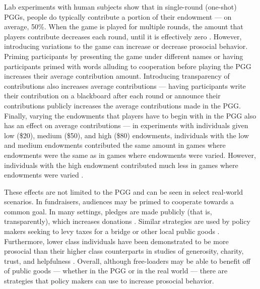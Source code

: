 Lab experiments with human subjects show that in single-round (one-shot) PGGs, people do typically contribute a portion of their endowment — on average, 50\%. When the game is played for multiple rounds, the amount that players contribute decreases each round, until it is effectively zero \cite{labexperiments}. However, introducing variations to the game can increase or decrease prosocial behavior. Priming participants by presenting the game under different names \cite{Eriksson_Strimling_2014} or having participants primed with words alluding to cooperation before playing the PGG \cite{drouvelis2015priming} increases their average contribution amount. Introducing transparency of contributions also increases average contributions — having participants write their contribution on a blackboard after each round \cite{rege2004impact} or announce their contributions publicly \cite{transparencytwo} increases the average contributions made in the PGG. Finally, varying the endowments that players have to begin with in the PGG also has an effect on average contributions — in experiments with individuals given low (\$20), medium (\$50), and high (\$80) endowments, individuals with the low and medium endowments contributed the same amount in games where endowments were the same as in games where endowments were varied. However, individuals with the high endowment contributed much less in games where endowments were varied \cite{HARGREAVESHEAP20164}.

These effects are not limited to the PGG and can be seen in select real-world scenarios. In fundraisers, audiences may be primed to cooperate towards a common goal. In many settings, pledges are made publicly (that is, transparently), which increases donations \cite{Bhati2020-xw, Oppenheimer2011-zh}. Similar strategies are used by policy makers seeking to levy taxes for a bridge or other local public goods \cite{parks2013cooperation}. Furthermore, lower class individuals have been demonstrated to be more prosocial than their higher class counterparts in studies of generosity, charity, trust, and helpfulness \cite{piff2010having}. Overall, although free-loaders may be able to benefit off of public goods — whether in the PGG or in the real world — there are strategies that policy makers can use to increase prosocial behavior.



%